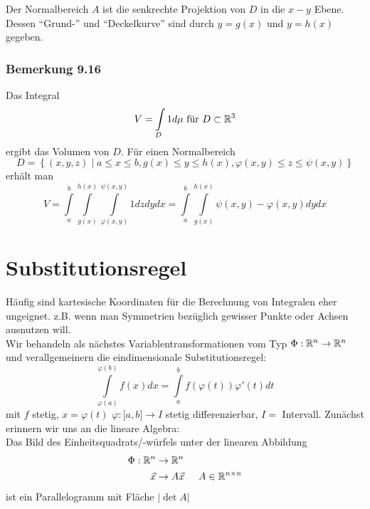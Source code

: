 Der Normalbereich $A$ ist die senkrechte Projektion von $D$ in die $x-y$ Ebene. Dessen ``Grund-'' und ``Deckelkurve'' sind durch $y=g(x)$ und $y=h(x)$ gegeben.

\subsubsection*{Bemerkung 9.16}
Das Integral
\[ V=\int\limits_D 1 d\mu\text{ für }D\subset\mathbb{R}^3\]
ergibt das Volumen von $D$. Für einen Normalbereich
\[D = \left\{ {\left( {x,y,z} \right)\mid a \le x \le b,g(x) \le y \le h(x),\varphi \left( {x,y} \right) \le z \le \psi \left( {x,y} \right)} \right\}\]
 erhält man
\[V = \int\limits_a^b {\int\limits_{g(x)}^{h(x)} {\int\limits_{\varphi \left( {x,y} \right)}^{\psi \left( {x,y} \right)} {1dzdydx} } }  = \int\limits_a^b {\int\limits_{g(x)}^{h(x)} {\psi \left( {x,y} \right) - \varphi \left( {x,y} \right)dydx} } \]

\section{Substitutionsregel}
Häufig sind kartesische Koordinaten für die Berechnung von Integralen eher ungeignet. z.B. wenn man Symmetrien bezüglich gewisser Punkte oder Achsen ausnutzen will.\\

Wir behandeln als nächstes Variablentransformationen vom Typ $\Phi:\mathbb{R}^n\to\mathbb{R}^n$ und verallgemeinern die eindimensionale Substitutionsregel:
\[\int\limits_{\varphi (a)}^{\varphi (b)} {f(x)dx}  = \int\limits_a^b {f\left( {\varphi \left( t \right)} \right)\varphi '\left( t \right)dt} \]
mit $f$ stetig, $x=\varphi\left( t\right)$ $\varphi :\lbrack a,b\rbrack\to I$ stetig differenzierbar, $I=$ Intervall. Zunächst erinnern wir uns an die lineare Algebra:\\

Das Bild des Einheitsquadrats/-würfels unter der linearen Abbildung
\begin{align*}
\Phi:\mathbb{R}^n&\to\mathbb{R}^n\\
\vec x&\to A\vec x\hspace{5mm}A\in\mathbb{R}^{n\times n}
\end{align*}
ist ein Parallelogramm mit Fläche $\left| \det A\right|$

\begin{center}
\end{center}

